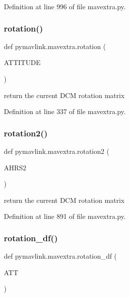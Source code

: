 Definition at line 996 of file mavextra.\+py.

\mbox{\label{namespacepymavlink_1_1mavextra_a28d2ae204e94f85443cb66a3f4231d80}} 
\subsubsection{\texorpdfstring{rotation()}{rotation()}}
{\footnotesize\ttfamily def pymavlink.\+mavextra.\+rotation (\begin{DoxyParamCaption}\item[{}]{A\+T\+T\+I\+T\+U\+DE }\end{DoxyParamCaption})}

\begin{DoxyVerb}return the current DCM rotation matrix\end{DoxyVerb}
 

Definition at line 337 of file mavextra.\+py.

\mbox{\label{namespacepymavlink_1_1mavextra_abaf31a27857e3a949ad5166c35d11773}} 
\subsubsection{\texorpdfstring{rotation2()}{rotation2()}}
{\footnotesize\ttfamily def pymavlink.\+mavextra.\+rotation2 (\begin{DoxyParamCaption}\item[{}]{A\+H\+R\+S2 }\end{DoxyParamCaption})}

\begin{DoxyVerb}return the current DCM rotation matrix\end{DoxyVerb}
 

Definition at line 891 of file mavextra.\+py.

\mbox{\label{namespacepymavlink_1_1mavextra_a8d3483c735e242ad8bb46001dae2284a}} 
\subsubsection{\texorpdfstring{rotation\_df()}{rotation\_df()}}
{\footnotesize\ttfamily def pymavlink.\+mavextra.\+rotation\+\_\+df (\begin{DoxyParamCaption}\item[{}]{A\+TT }\end{DoxyParamCaption})}

